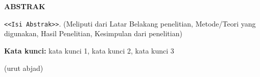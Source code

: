 \chapter*{\Judul}
\singlespacing
\begin{center}
    
    \vspace{-4em}
    
    \penulis
    
	\bigskip
    
    \textbf{ABSTRAK}
    
\end{center}


\vspace*{0.2cm}
{
	\setlength{\parindent}{0pt}

	\bigskip
	\bigskip

\verb|<<Isi Abstrak>>|. (Meliputi dari Latar Belakang penelitian, Metode/Teori yang digunakan, Hasil Penelitian, Kesimpulan dari penelitian)
	\bigskip
 
	\textbf{Kata kunci:} kata kunci 1, kata kunci 2, kata kunci 3
} (urut abjad)

\onehalfspacing
